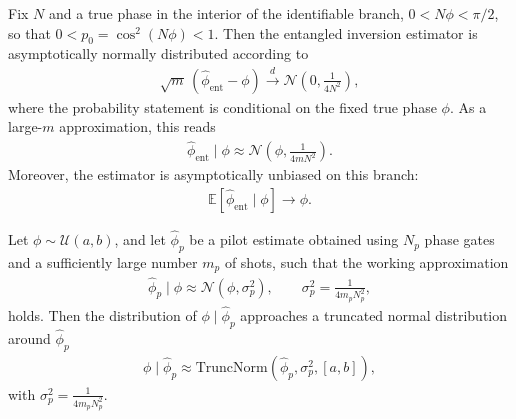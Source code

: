 \begin{lemma}\label{lemma:asymp-dist-est}
Fix $N$ and a true phase in the interior of the identifiable branch, $0<N\phi<\pi/2$, so that $0<p_0=\cos^2(N\phi)<1$.
Then the entangled inversion estimator is asymptotically normally distributed according to
\begin{align}
    \sqrt{m}\,(\hat\phi_\text{ent}-\phi) \xrightarrow{d} \mathcal N\!\left(0, \frac{1}{4N^2}\right),
\end{align}
where the probability statement is conditional on the fixed true phase $\phi$.
As a large-$m$ approximation, this reads
\begin{align}
    \hat\phi_\text{ent} \mid \phi \approx \mathcal N\!\left(\phi, \frac{1}{4mN^2}\right).
\end{align}
Moreover, the estimator is asymptotically unbiased on this branch:
\begin{align}
    \mathbb E[\hat \phi_\text{ent} \mid \phi] \rightarrow \phi.
\end{align}
\end{lemma}

\begin{theorem}\label{thm:asympt-dist-given-pilot}
    Let $\phi\sim\mathcal U(a,b)$, and let $\hat\phi_p$ be a pilot estimate obtained using $N_p$ phase gates and a sufficiently large number $m_p$ of shots, such that the working approximation
    \begin{align}
        \hat\phi_p \mid \phi \approx \mathcal N(\phi,\sigma_p^2),
        \qquad
        \sigma_p^2=\frac{1}{4m_pN_p^2},
    \end{align}
    holds.
    Then the distribution of $\phi \mid \hat\phi_p$ approaches a truncated normal distribution \cite{johnson1994continuous} around $\hat\phi_p$
    \begin{align}
        \phi \mid \hat\phi_p \approx \text{TruncNorm}(\hat\phi_p, \sigma_p^2, [a, b]),
    \end{align}
    with $\sigma_p^2 = \frac{1}{4m_p N_p^2}$.
\end{theorem}

